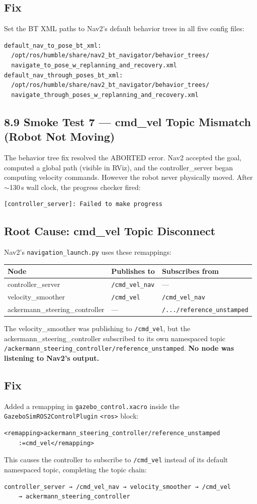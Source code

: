 \documentclass[11pt]{article}
\newcommand{\logentry}[1]{\subsection*{#1}}
\begin{document}
\logentry{Fix}
Set the BT XML paths to Nav2's default behavior trees in all five config
files:
\begin{verbatim}
default_nav_to_pose_bt_xml:
  /opt/ros/humble/share/nav2_bt_navigator/behavior_trees/
  navigate_to_pose_w_replanning_and_recovery.xml
default_nav_through_poses_bt_xml:
  /opt/ros/humble/share/nav2_bt_navigator/behavior_trees/
  navigate_through_poses_w_replanning_and_recovery.xml
\end{verbatim}


\subsection*{8.9 Smoke Test 7 --- cmd\_vel Topic Mismatch (Robot Not Moving)}

The behavior tree fix resolved the ABORTED error.  Nav2 accepted the goal,
computed a global path (visible in RViz), and the controller\_server began
computing velocity commands.  However the robot never physically moved.
After $\sim$130\,s wall clock, the progress checker fired:
\begin{verbatim}
[controller_server]: Failed to make progress
\end{verbatim}

\logentry{Root Cause: cmd\_vel Topic Disconnect}
Nav2's \texttt{navigation\_launch.py} uses these remappings:
\begin{center}
\begin{tabular}{lll}
\textbf{Node} & \textbf{Publishes to} & \textbf{Subscribes from} \\
\hline
controller\_server & \texttt{/cmd\_vel\_nav} & --- \\
velocity\_smoother & \texttt{/cmd\_vel} & \texttt{/cmd\_vel\_nav} \\
\hline
ackermann\_steering\_controller & --- & \texttt{/.../reference\_unstamped} \\
\end{tabular}
\end{center}
The velocity\_smoother was publishing to \texttt{/cmd\_vel}, but the
ackermann\_steering\_controller subscribed to its own namespaced topic
\texttt{/ackermann\_steering\_controller/reference\_unstamped}.
\textbf{No node was listening to Nav2's output.}

\logentry{Fix}
Added a remapping in \texttt{gazebo\_control.xacro} inside the
\texttt{GazeboSimROS2ControlPlugin} \texttt{<ros>} block:
\begin{verbatim}
<remapping>ackermann_steering_controller/reference_unstamped
    :=cmd_vel</remapping>
\end{verbatim}
This causes the controller to subscribe to \texttt{/cmd\_vel} instead of its
default namespaced topic, completing the topic chain:
\begin{verbatim}
controller_server → /cmd_vel_nav → velocity_smoother → /cmd_vel
    → ackermann_steering_controller
\end{verbatim}
\end{document}

